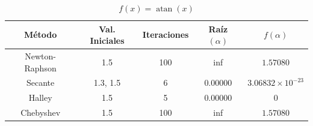 \begin{table}[H]
\centering

\renewcommand{\arraystretch}{1.3} %
\setlength{\tabcolsep}{12pt}      %

\begin{tabular}{ccccc}
\hline
Método & Val. Iniciales & Iteraciones & Raíz $(\alpha)$ & $f(\alpha)$ \\
\hline

Newton-Raphson & 1.5      & 100 & inf     & $1.57080$            \\

Secante        & 1.3, 1.5 &   6 & 0.00000 & $3.06832\times10^{-23}$ \\

Halley         & 1.5      &   5 & 0.00000 & 0                    \\

Chebyshev      & 1.5      & 100 & inf     & $1.57080$            \\

\hline
\end{tabular}

\caption{$f(x) = \operatorname{atan}{\left(x \right)}$}
\end{table}


